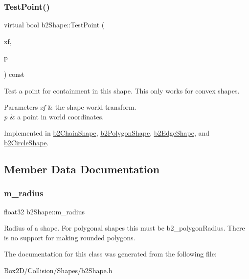 \subsubsection{\texorpdfstring{Test\+Point()}{TestPoint()}}
{\footnotesize\ttfamily virtual bool b2\+Shape\+::\+Test\+Point (\begin{DoxyParamCaption}\item[{const \hyperlink{structb2_transform}{b2\+Transform} \&}]{xf,  }\item[{const \hyperlink{structb2_vec2}{b2\+Vec2} \&}]{p }\end{DoxyParamCaption}) const\hspace{0.3cm}{\ttfamily [pure virtual]}}

Test a point for containment in this shape. This only works for convex shapes. 
\begin{DoxyParams}{Parameters}
{\em xf} & the shape world transform. \\
\hline
{\em p} & a point in world coordinates. \\
\hline
\end{DoxyParams}


Implemented in \hyperlink{classb2_chain_shape_afd03c8679f18f9962a6c76bde629c62a}{b2\+Chain\+Shape}, \hyperlink{classb2_polygon_shape_a129c4ac76727fe02724f675e3fef7fe5}{b2\+Polygon\+Shape}, \hyperlink{classb2_edge_shape_a15151673cf9ad585779c70363425f470}{b2\+Edge\+Shape}, and \hyperlink{classb2_circle_shape_a84e22b3807e84b72f2981010fc197099}{b2\+Circle\+Shape}.



\subsection{Member Data Documentation}
\mbox{\label{classb2_shape_a5de7a9bd3f9e72ef7025a65c304aaf1a}} 
\subsubsection{\texorpdfstring{m\+\_\+radius}{m\_radius}}
{\footnotesize\ttfamily float32 b2\+Shape\+::m\+\_\+radius}

Radius of a shape. For polygonal shapes this must be b2\+\_\+polygon\+Radius. There is no support for making rounded polygons. 

The documentation for this class was generated from the following file\+:\begin{DoxyCompactItemize}
\item 
Box2\+D/\+Collision/\+Shapes/b2\+Shape.\+h\end{DoxyCompactItemize}

